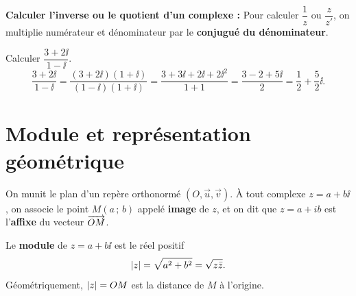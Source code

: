 \begin{methode}
	\textbf{Calculer l'inverse ou le quotient d'un complexe :}
	Pour calculer $\dfrac{1}{z}$ ou $\dfrac{z}{z'}$, on multiplie numérateur et dénominateur
	par le \textbf{conjugué du dénominateur}.
\end{methode}

\begin{exemple}
	Calculer $\dfrac{3 + 2\ii}{1 - \ii}$.
	$$
	\frac{3 + 2\ii}{1 - \ii}
	= \frac{(3 + 2\ii)(1 + \ii)}{(1 - \ii)(1 + \ii)}
	= \frac{3 + 3\ii + 2\ii + 2\ii^2}{1 + 1}
	= \frac{3 - 2 + 5\ii}{2}
	= \frac{1}{2} + \frac{5}{2}\ii.
	$$
\end{exemple}


\section{Module et représentation géométrique}

\begin{definition}
	On munit le plan d'un repère orthonormé $(O, \vec{u}, \vec{v})$.
	À tout complexe $z = a + b\ii$, on associe le point $M(a\,;\,b)$
	appelé \textbf{image} de $z$, et on dit que $z=a+ib$ est l'\textbf{affixe} du vecteur $\overrightarrow{OM}$.
\end{definition}

\begin{definition}[Module]
	Le \textbf{module} de $z = a + b\ii$ est le réel positif
	$$
	\left|z\right| = \sqrt{a^2 + b^2} = \sqrt{z \bar{z}}.
	$$
	Géométriquement, $\left|z\right| = OM$ est la distance de $M$ à l'origine.
\end{definition}



